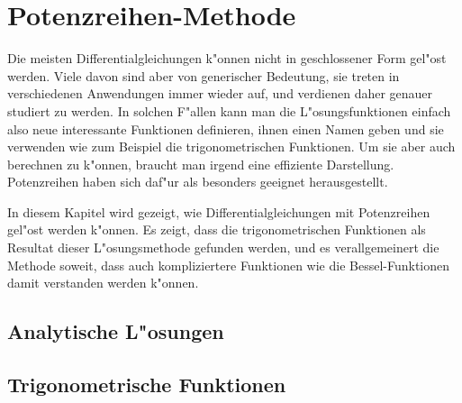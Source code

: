 %
%
%
\chapter{Potenzreihen-Methode\label{chapter:potenzreihen}}
\lhead{}
Die meisten Differentialgleichungen k"onnen nicht in geschlossener
Form gel"ost werden.
Viele davon sind aber von generischer Bedeutung, sie treten
in verschiedenen Anwendungen immer wieder auf, und verdienen daher
genauer studiert zu werden.
In solchen F"allen kann man die L"osungsfunktionen einfach also
neue interessante Funktionen definieren, ihnen einen Namen geben
und sie verwenden wie zum Beispiel die trigonometrischen Funktionen.
Um sie aber auch berechnen zu k"onnen, braucht man irgend eine 
effiziente Darstellung.
Potenzreihen haben sich daf"ur als besonders geeignet herausgestellt.

In diesem Kapitel wird gezeigt, wie Differentialgleichungen mit Potenzreihen
gel"ost werden k"onnen.
Es zeigt, dass die trigonometrischen Funktionen als Resultat
dieser L"osungsmethode gefunden werden, und es verallgemeinert die
Methode soweit, dass auch kompliziertere Funktionen wie die
Bessel-Funktionen damit verstanden werden k"onnen.

\section{Analytische L"osungen
\label{section:potenzreihen:analytisch}}

\section{Trigonometrische Funktionen
\label{section:potenzreihen:trigo}}

